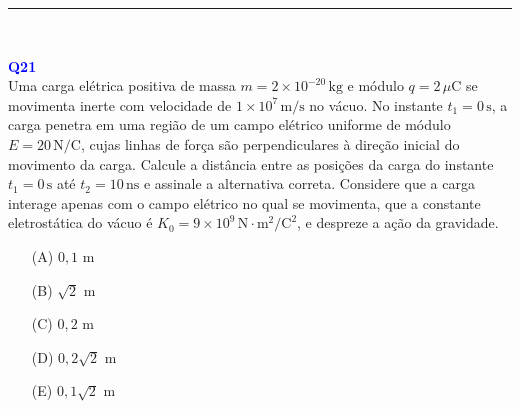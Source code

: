 \documentclass[a4paper,12pt]{article}
\begin{document}
\noindent\rule{\linewidth}{0.6pt}\\

\begin{flushleft}
\textbf{\textcolor{blue}{\Large Q21}}\\

Uma carga elétrica positiva de massa \( m = 2 \times 10^{-20} \, \text{kg} \) e módulo \( q = 2 \, \mu\text{C} \) se movimenta
inerte com velocidade de \( 1 \times 10^7 \, \text{m/s} \) no vácuo. No instante \( t_1 = 0 \, \text{s} \), a carga penetra 
em uma região de um campo elétrico uniforme de módulo \( E = 20 \, \text{N/C} \), cujas linhas de força são perpendiculares 
à direção inicial do movimento da carga. Calcule a distância entre as posições da carga do instante \( t_1 = 0 \, \text{s} \) 
até \( t_2 = 10 \, \text{ns} \) e assinale a alternativa correta. Considere que a carga interage apenas com o campo elétrico 
no qual se movimenta, que a constante eletrostática do vácuo é \( K_0 = 9 \times 10^9 \, \text{N}\cdot\text{m}^2/\text{C}^2 \), 
e despreze a ação da gravidade.

\begin{itemize}
\item[(A)] $0{,}1$ m
\item[(B)] $\sqrt{2}$ m  
\item[(C)] $0{,}2$ m
\item[(D)] $0{,}2\sqrt{2}$ m  
\item[(E)] $0{,}1\sqrt{2}$ m  
\end{itemize}

\vspace{0.5cm}

\begin{center}
\end{center}
\end{flushleft}
\end{document}
